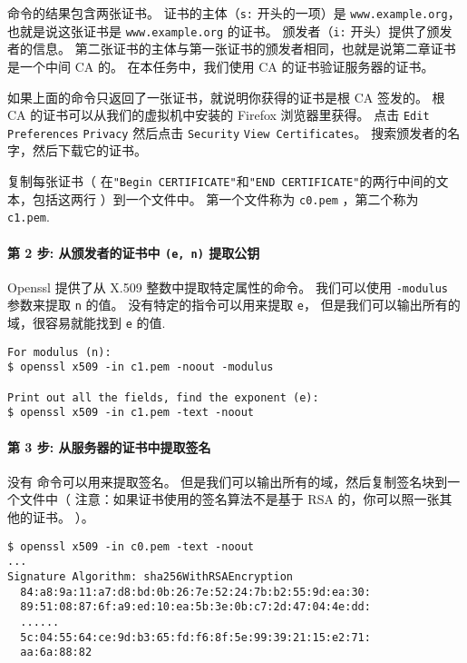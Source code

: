 命令的结果包含两张证书。
证书的主体（\texttt{s:} 开头的一项）是 \texttt{www.example.org}，也就是说这张证书是 \texttt{www.example.org} 的证书。
颁发者（\texttt{i:} 开头）提供了颁发者的信息。
第二张证书的主体与第一张证书的颁发者相同，也就是说第二章证书是一个中间 CA 的。
在本任务中，我们使用 CA 的证书验证服务器的证书。

如果上面的命令只返回了一张证书，就说明你获得的证书是根 CA 签发的。
根 CA 的证书可以从我们的虚拟机中安装的 Firefox 浏览器里获得。
点击 \texttt{Edit}  \texttt{Preferences}
 \texttt{Privacy}  然后点击 \texttt{Security}  \texttt{View Certificates}。
搜索颁发者的名字，然后下载它的证书。

复制每张证书（
在\texttt{"Begin CERTIFICATE"}和\texttt{"END CERTIFICATE"}的两行中间的文本，包括这两行
）到一个文件中。
第一个文件称为 \texttt{c0.pem} ，第二个称为 \texttt{c1.pem}.


\paragraph{第 2 步: 从颁发者的证书中 \texttt{(e, n)} 提取公钥}
Openssl 提供了从 X.509 整数中提取特定属性的命令。
我们可以使用 \texttt{-modulus} 参数来提取 \texttt{n} 的值。
没有特定的指令可以用来提取 \texttt{e}，
但是我们可以输出所有的域，很容易就能找到 \texttt{e} 的值.

\begin{lstlisting}
For modulus (n):
$ openssl x509 -in c1.pem -noout -modulus

Print out all the fields, find the exponent (e):
$ openssl x509 -in c1.pem -text -noout
\end{lstlisting}


\paragraph{第 3 步: 从服务器的证书中提取签名}
没有 \openssl 命令可以用来提取签名。
但是我们可以输出所有的域，然后复制签名块到一个文件中（
注意：如果证书使用的签名算法不是基于 RSA 的，你可以照一张其他的证书。
）。

\begin{lstlisting}
$ openssl x509 -in c0.pem -text -noout
...
Signature Algorithm: sha256WithRSAEncryption
  84:a8:9a:11:a7:d8:bd:0b:26:7e:52:24:7b:b2:55:9d:ea:30:
  89:51:08:87:6f:a9:ed:10:ea:5b:3e:0b:c7:2d:47:04:4e:dd:
  ......
  5c:04:55:64:ce:9d:b3:65:fd:f6:8f:5e:99:39:21:15:e2:71:
  aa:6a:88:82
\end{lstlisting}

